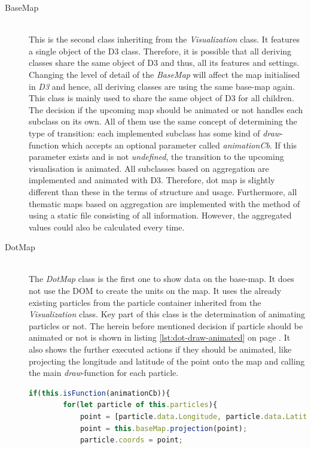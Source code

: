 \begin{description}
\item[BaseMap] \hfill \\
This is the second class inheriting from the \textit{Visualization} class. It features a single object of the \ac{D3} class. Therefore, it is possible that all deriving classes share the same object of \ac{D3} and thus, all its features and settings. Changing the level of detail of the \textit{BaseMap} will affect the map initialised in \textit{\ac{D3}} and hence, all deriving classes are using the same base-map again. This class is mainly used to share the same object of \ac{D3} for all children.
The decision if the upcoming map should be animated or not handles each subclass on its own. All of them use the same concept of determining the type of transition: each implemented subclass has some kind of \textit{draw}-function which accepts an optional parameter called \textit{animationCb}. If this parameter exists and is not \textit{undefined}, the transition to the upcoming visualisation is animated.
All subclasses based on aggregation are implemented and animated with \ac{D3}. Therefore, dot map is slightly different than these in the terms of structure and usage. Furthermore, all thematic maps based on aggregation are implemented with the method of using a static file consisting of all information. However, the aggregated values could also be calculated every time.

\item[DotMap] \hfill \\
The \textit{DotMap} class is the first one to show data on the base-map. It does not use the \ac{DOM} to create the units on the map. It uses the already existing particles from the particle container inherited from the \textit{Visualization} class. Key part of this class is the determination of animating particles or not.
The herein before mentioned decision if particle should be animated or not is shown in listing \ref{lst:dot-draw-animated} on page \pageref{lst:dot-draw-animated}. It also shows the further executed actions if they should be animated, like projecting the longitude and latitude of the point onto the map and calling the main \textit{draw}-function for each particle.

\begin{lstlisting}[language=JavaScript, caption={Particles on a dot map getting animated.}, label={lst:dot-draw-animated}]
    if(this.isFunction(animationCb)){
        for(let particle of this.particles){
            point = [particle.data.Longitude, particle.data.Latitude];
            point = this.baseMap.projection(point);
            particle.coords = point;


\end{lstlisting}
\end{description}
